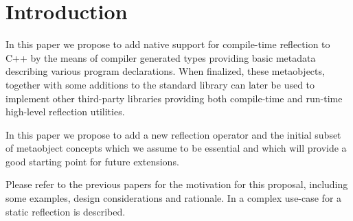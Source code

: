 \section{Introduction}

In this paper we propose to add native support for
compile-time reflection to C++ by the means of compiler generated
types providing basic metadata describing various program declarations.
When finalized, these metaobjects, together with some additions to the standard
library can later be used to implement other third-party libraries
providing both compile-time and run-time high-level
reflection utilities.

In this paper we propose to add a new reflection operator and the initial subset
of metaobject concepts which we assume to be essential
and which will provide a good starting point for future extensions.

Please refer to the previous papers \cite{n3996,n4111,n4451,n4452}
for the motivation for this proposal, including some examples,
design considerations and rationale. In \cite{ITFPWTHOR} a complex use-case
for a static reflection is described.

